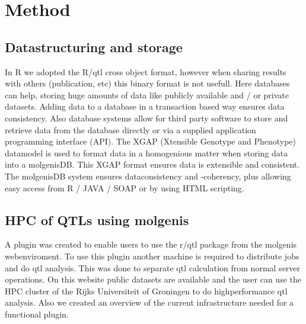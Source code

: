\section{Method}
\subsection{Datastructuring and storage}
In R we adopted the R/qtl cross object format, however when sharing results with others 
(publication, etc) this binary format is not usefull. Here databases can help, storing huge amounts of data like publicly available 
and / or private datasets. Adding data to a database in a transaction based way ensures data consistency. 
Also database systems allow for third party software to store and retrieve data from the database directly or via
a supplied application programming interface (API). The XGAP \cite{morris07} (Xtensible Genotype and Phenotype) datamodel is used 
to format data in a homogenious matter when storing data into a molgenisDB. This XGAP format ensures data 
is extensible and consistent. The molgenisDB system ensures dataconsistency and -coherency, plus allowing easy 
access from R / JAVA / SOAP or by using HTML scripting.
\subsection{HPC of QTLs using molgenis}
A plugin was created to enable users to use the r/qtl package from the molgenis webenviroment. To use this plugin another machine is required 
to distribute jobs and do qtl analysis. This was done to separate qtl calculation from normal server operations.
On this website public datasets are available and the user can use the HPC cluster of the Rijks Universiteit of Groningen to do highperformance qtl analysis.
Also we created an overview of the current infrastructure needed for a functional plugin.